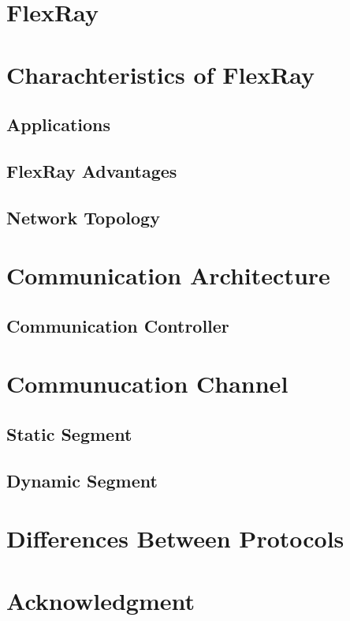\documentclass[conference]{IEEEtran}
\begin{document}
\section{FlexRay}

\section{Charachteristics of FlexRay}


\subsection{Applications}


\subsection{FlexRay Advantages}

\subsection{Network Topology}

\section{Communication Architecture}

\subsection{Communication Controller}

\section{Communucation Channel}


\subsection{Static Segment}

\subsection{Dynamic Segment}

\section{Differences Between Protocols}

\section*{Acknowledgment}
\end{document}
